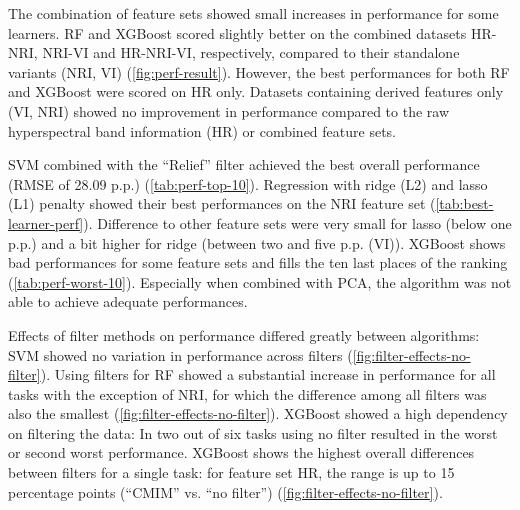 \documentclass[journal]{IEEEtran}
\begin{document}
The combination of feature sets showed small increases in performance for some learners.
RF and XGBoost scored slightly better on the combined datasets HR-NRI, NRI-VI and HR-NRI-VI, respectively, compared to their standalone variants (NRI, VI) (\autoref{fig:perf-result}).
However, the best performances for both RF and XGBoost were scored on HR only.
Datasets containing derived features only (VI, NRI) showed no improvement in performance compared to the raw hyperspectral band information (HR) or combined feature sets.

SVM combined with the \enquote{Relief} filter achieved the best overall performance (RMSE of 28.09 p.p.) (\autoref{tab:perf-top-10}).
Regression with ridge (L2) and lasso (L1) penalty showed their best performances on the NRI feature set (\autoref{tab:best-learner-perf}).
Difference to other feature sets were very small for lasso (below one p.p.) and a bit higher for ridge (between two and five p.p. (VI)).
XGBoost shows bad performances for some feature sets and fills the ten last places of the ranking (\autoref{tab:perf-worst-10}).
Especially when combined with PCA, the algorithm was not able to achieve adequate performances.

Effects of filter methods on performance differed greatly between algorithms:
SVM showed no variation in performance across filters (\autoref{fig:filter-effects-no-filter}).
Using filters for RF showed a substantial increase in performance for all tasks with the exception of NRI, for which the difference among all filters was also the smallest (\autoref{fig:filter-effects-no-filter}).
XGBoost showed a high dependency on filtering the data: In two out of six tasks using no filter resulted in the worst or second worst performance.
XGBoost shows the highest overall differences between filters for a single task: for feature set HR, the range is up to 15 percentage points (\enquote{CMIM} vs. \enquote{no filter}) (\autoref{fig:filter-effects-no-filter}).
\end{document}
